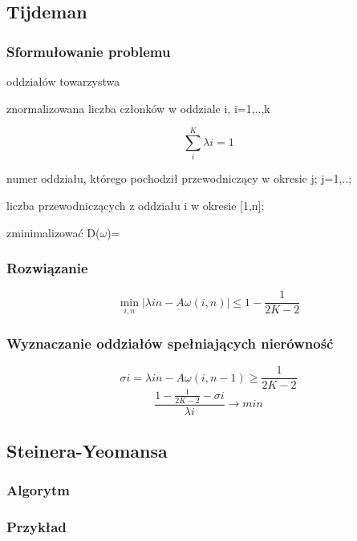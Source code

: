 \documentclass[12pt,a4paper]{article}
\begin{document}
\newpage
\subsection{Tijdeman}
\subsubsection{Sformułowanie problemu}
\begin{description}
\item[k] oddziałów towarzystwa
\item[$\lambda$i] znormalizowana liczba członków w oddziale i, i=1,..,k
\item \begin{equation}
\sum \limits_{i}^{K} \lambda i = 1
\end{equation}
\item[$\omega$i] numer oddziału, którego pochodził przewodniczący w okresie j; j=1,..;
\item[A$\omega$(i,n)] liczba przewodniczących z oddziału i w okresie [1,n]; 
\item zminimalizować D($\omega$)=
\end{description}

\subsubsection{Rozwiązanie}
\begin{equation}
\min\limits_{i,n}\left | \lambda in - A\omega(i,n)\right | \leq 1-\frac{1}{2K-2}
\end{equation}
\subsubsection{Wyznaczanie oddziałów spełniających nierówność}
\begin{equation}
\sigma i = \lambda in - A\omega (i,n-1) \geq \frac{1}{2K-2}
\end{equation}
\begin{equation}
\frac{1-\frac{1}{2K-2}-\sigma i}{\lambda i} \to min
\end{equation}
\subsection{Steinera-Yeomansa}
\subsubsection{Algorytm}
\subsubsection{Przykład}
\end{document}
